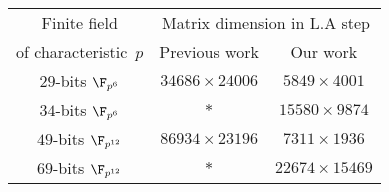 \documentclass[preview]{standalone}
\begin{document}
\begin{center}
\begin{tabular}{|c|c|c|}
                        \hline
                        Finite field & \multicolumn{2}{c|}{Matrix dimension in L.A step} \\
                        \cline{2-3}
                        of characteristic~$p$ & Previous work & Our work \\
                        \hline
                        $29$-bits $\F_{p^6}$ & $34686 \times 24006$ & $5849 \times 4001$ \\
                        \hline
                        $34$-bits $\F_{p^6}$ & $ * $ & $15580 \times 9874$ \\
                        \hline
                        $49$-bits $\F_{p^{12}}$ & $86934 \times 23196$ & $7311 \times 1936$ \\
                        \hline
                        $69$-bits $\F_{p^{12}}$ & $ * $ & $22674 \times 15469$ \\
                        \hline
                        \end{tabular}
\end{center}
\end{document}
